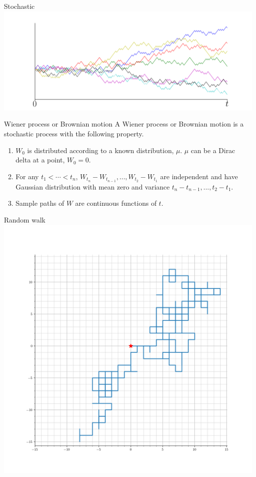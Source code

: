 \documentclass[color=usenames,dvipsnames]{beamer}
\begin{document}
\begin{frame}{Stochastic}
    \includegraphics[width=0.95\linewidth]{Control_lecture_notes/Figs/bm_1d_100.png}
\end{frame}
\begin{frame}{Wiener process or Brownian motion}
    A Wiener process or Brownian motion is a stochastic process with the following property.
    \begin{enumerate}[label = \bfseries \arabic*)]
        \item $W_0$ is distributed according to a known distribution, $\mu$. $\mu$ can be a Dirac delta at a point, $W_0=0$.
        \item For any $t_{1}<\cdots<t_{n}$, $W_{t_{n}}-W_{t_{n-1}},...,W_{t_{2}}-W_{t_{1}}$ are independent and have Gaussian distribution with mean zero and variance $t_{n}-t_{n-1},...,t_{2}-t_{1}$.
        \item Sample paths of $W$ are continuous functions of $t$.
    \end{enumerate}
\end{frame}

\begin{frame}{Random walk}
    \includegraphics[width=0.75\linewidth]{Control_lecture_notes/Figs/rw_2d_1.png}
\end{frame}
\end{document}
